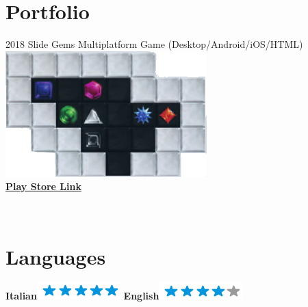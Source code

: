 \documentclass[]{friggeri-cv}
\begin{document}
\section{Portfolio}
\begin{entrylist}
  \entry
    {2018}
    {Slide Gems}
    {Multiplatform Game (Desktop/Android/iOS/HTML)}
    {{\includegraphics[scale=0.50]{img/slide_gems_snip.png}}\\\href{https://bit.ly/2Gwwct5}{\textbf{Play Store Link}}}
    
    
     
\end{entrylist}

\newpage

\begin{aside}
~
~
~
    ~
    ~
  \section{Languages}
    \textbf{Italian}\includegraphics[scale=0.40]{img/5stars.png}
    \textbf{English}\includegraphics[scale=0.40]{img/4stars.png}
    ~
\end{aside}
\end{document}
